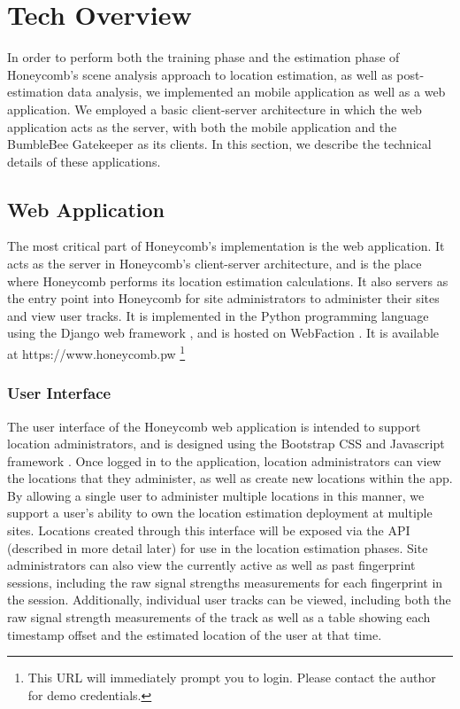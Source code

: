 \chapter{Tech Overview}
\label{tech-overview}
%

In order to perform both the training phase and the estimation phase of Honeycomb's scene analysis approach to location estimation, as well as post-estimation data analysis, we implemented an mobile application as well as a web application. We employed a basic client-server architecture in which the web application acts as the server, with both the mobile application and the BumbleBee Gatekeeper as its clients. In this section, we describe the technical details of these applications.


\section{Web Application}
%


The most critical part of Honeycomb's implementation is the web application. It acts as the server in Honeycomb's client-server architecture, and is the place where Honeycomb performs its location estimation calculations. It also servers as the entry point into Honeycomb for site administrators to administer their sites and view user tracks. It is implemented in the Python programming language using the Django web framework \cite{django}, and is hosted on WebFaction \cite{webfaction}. It is available at https://www.honeycomb.pw \footnote{This URL will immediately prompt you to login. Please contact the author for demo credentials.}


\subsection{User Interface}
%


The user interface of the Honeycomb web application is intended to support location administrators, and is designed using the Bootstrap CSS and Javascript framework \cite{bootstrap}. Once logged in to the application, location administrators can view the locations that they administer, as well as create new locations within the app. By allowing a single user to administer multiple locations in this manner, we support a user's ability to own the location estimation deployment at multiple sites. Locations created through this interface will be exposed via the API (described in more detail later) for use in the location estimation phases. Site administrators can also view the currently active as well as past fingerprint sessions, including the raw signal strengths measurements for each fingerprint in the session. Additionally, individual user tracks can be viewed, including both the raw signal strength measurements of the track as well as a table showing each timestamp offset and the estimated location of the user at that time. 
	

